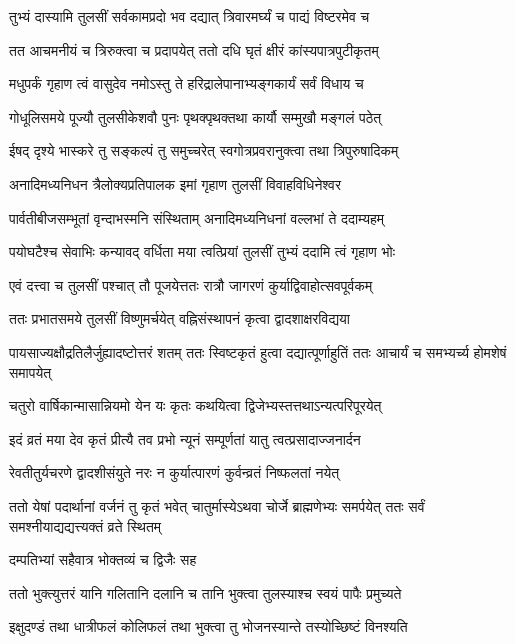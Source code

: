 \twolineshloka
{तुभ्यं दास्यामि तुलसीं सर्वकामप्रदो भव}
{दद्यात् त्रिवारमर्घ्यं च पाद्यं विष्टरमेव च} %

\twolineshloka
{तत आचमनीयं च त्रिरुक्त्वा च प्रदापयेत्}
{ततो दधि घृतं क्षीरं कांस्यपात्रपुटीकृतम्} %

\twolineshloka
{मधुपर्कं गृहाण त्वं वासुदेव नमोऽस्तु ते}
{हरिद्रालेपानाभ्यङ्गकार्यं सर्वं विधाय च} %

\twolineshloka
{गोधूलिसमये पूज्यौ तुलसीकेशवौ पुनः}
{पृथक्पृथक्तथा कार्यौ सम्मुखौ मङ्गलं पठेत्} %

\twolineshloka
{ईषद् दृश्ये भास्करे तु सङ्कल्पं तु समुच्चरेत्}
{स्वगोत्रप्रवरानुक्त्वा तथा त्रिपुरुषादिकम्} %

\twolineshloka
{अनादिमध्यनिधन त्रैलोक्यप्रतिपालक}
{इमां गृहाण तुलसीं विवाहविधिनेश्वर} %

\twolineshloka
{पार्वतीबीजसम्भूतां वृन्दाभस्मनि संस्थिताम्}
{अनादिमध्यनिधनां वल्लभां ते ददाम्यहम्} %

\twolineshloka
{पयोघटैश्च सेवाभिः कन्यावद् वर्धिता मया}
{त्वत्प्रियां तुलसीं तुभ्यं ददामि त्वं गृहाण भोः} %

\twolineshloka
{एवं दत्त्वा च तुलसीं पश्चात् तौ पूजयेत्ततः}
{रात्रौ जागरणं कुर्याद्विवाहोत्सवपूर्वकम्} %

\twolineshloka
{ततः प्रभातसमये तुलसीं विष्णुमर्चयेत्}
{वह्निसंस्थापनं कृत्वा द्वादशाक्षरविद्यया} %

\threelineshloka
{पायसाज्यक्षौद्रतिलैर्जुह्यादष्टोत्तरं शतम्}
{ततः स्विष्टकृतं हुत्वा दद्यात्पूर्णाहुतिं ततः}
{आचार्यं च समभ्यर्च्य होमशेषं समापयेत्} %

\twolineshloka
{चतुरो वार्षिकान्मासान्नियमो येन यः कृतः}
{कथयित्वा द्विजेभ्यस्तत्तथाऽन्यत्परिपूरयेत्} %

\twolineshloka
{इदं व्रतं मया देव कृतं प्रीत्यै तव प्रभो}
{न्यूनं सम्पूर्णतां यातु त्वत्प्रसादाज्जनार्दन} %

\twolineshloka
{रेवतीतुर्यचरणे द्वादशीसंयुते नरः}
{न कुर्यात्पारणं कुर्वन्व्रतं निष्फलतां नयेत्} %

\threelineshloka
{ततो येषां पदार्थानां वर्जनं तु कृतं भवेत्}
{चातुर्मास्येऽथवा चोर्जे ब्राह्मणेभ्यः समर्पयेत्}
{ततः सर्वं समश्नीयाद्यद्यत्त्यक्तं व्रते स्थितम्} %


\onelineshloka
{दम्पतिभ्यां सहैवात्र भोक्तव्यं च द्विजैः सह} %

\twolineshloka
{ततो भुक्त्युत्तरं यानि गलितानि दलानि च}
{तानि भुक्त्वा तुलस्याश्च स्वयं पापैः प्रमुच्यते} %

\twolineshloka
{इक्षुदण्डं तथा धात्रीफलं कोलिफलं तथा}
{भुक्त्वा तु भोजनस्यान्ते तस्योच्छिष्टं विनश्यति} %

